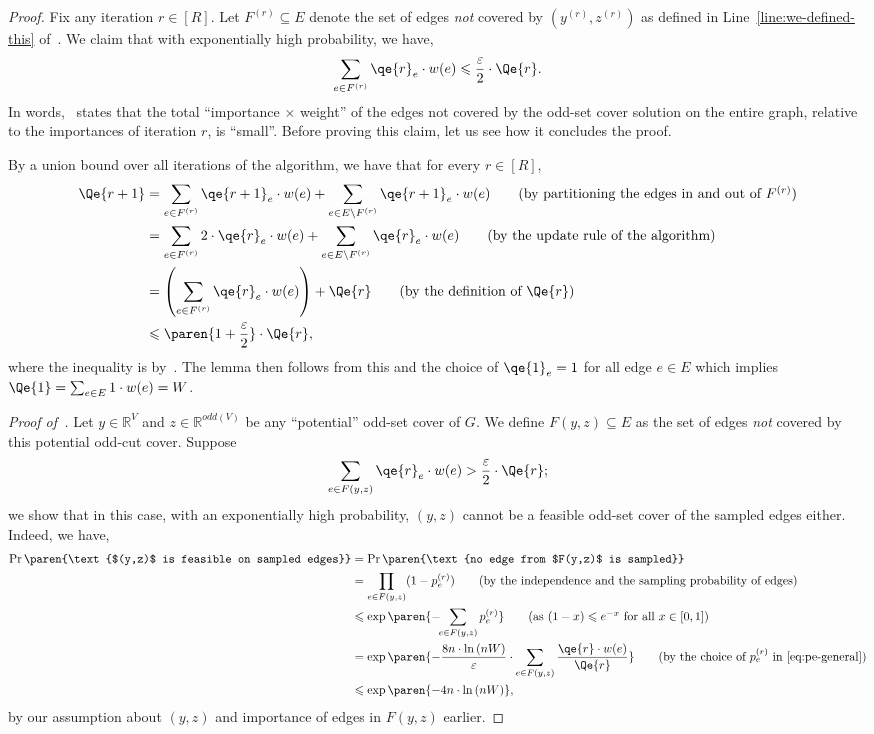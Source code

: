\documentclass{theoretics}
\renewcommand{\leq}{\leqslant}
\DeclarePairedDelimiter{\paren}()
\newcommand{\eps}{\varepsilon}
\newcommand{\IR}{\mathbb{R}}
\begin{document}
\begin{proof}
	Fix any iteration $r \in [R]$. Let $F^{(r)} \subseteq E$ denote the set of edges \emph{not} covered by $(y^{(r)},z^{(r)})$ as defined in Line~\eqref{line:we-defined-this} of~. We claim that with exponentially high probability, we have, 
	\begin{align}
		\sum_{e \in F^{(r)}} \qe{r}_e \cdot w(e) \leq \frac{\eps}{2} \cdot \Qe{r}. \label{eq:clm1-general}
	\end{align}
	In words,~ states that the total ``importance $\times$ weight'' of the edges {not} covered by the odd-set cover solution on the entire graph, relative to the importances of iteration $r$, is ``small''. Before proving this claim, let us see how it concludes the proof. 
	
	By a union bound over all iterations of the algorithm, we have that for every $r \in [R]$, 
	\begin{align*}
		\Qe{r+1} &= \sum_{e \in F^{(r)}} \qe{r+1}_e \cdot w(e) + \sum_{e \in E \setminus F^{(r)}} \qe{r+1}_e \cdot w(e) \tag{by partitioning the edges in and out of $F^{(r)}$} \\
		&= \sum_{e \in F^{(r)}} 2 \cdot \qe{r}_e \cdot w(e) + \sum_{e \in E \setminus F^{(r)}} \qe{r}_e \cdot w(e) \tag{by the update rule of the algorithm} \\
		&= \left({\sum_{e \in F^{(r)}} \qe{r}_e \cdot w(e)}\right) + \Qe{r} \tag{by the definition of $\Qe{r}$} \\
		&\leq \paren{1+\frac{\eps}{2}} \cdot \Qe{r},
	\end{align*}
	where the inequality is by~. The lemma then follows from this and the choice of $\qe{1}_e=1$ for all edge $e \in E$ which implies $\Qe{1} = \sum_{e \in E} 1 \cdot w(e) = W$. 
	
	\noindent
	\emph{Proof of~.} Let $y \in \IR^V$ and $z \in \IR^{odd(V)}$ be any ``potential'' odd-set cover of $G$. 
	We define $F(y,z) \subseteq E$ as the set of edges \emph{not} covered by this potential odd-cut cover. 
	Suppose 
	\[
		\sum_{e \in F(y,z)} \qe{r}_e \cdot w(e) > \frac{\eps}{2} \cdot \Qe{r};
	\]
	we show that in this case, with an exponentially high probability, $(y,z)$ cannot be a feasible odd-set cover  of the sampled edges either. Indeed, we have, 
	\begin{align*}
		\Pr\paren{\text{$(y,z)$ is feasible on sampled edges}} &= \Pr\paren{\text{no edge from $F(y,z)$ is sampled}} \\
		&= \prod_{e \in F(y,z)} (1-p^{(r)}_e) \tag{by the independence and the sampling probability of edges} \\
		&\leq \exp\paren{-\!\!\sum_{e \in F(y,z)} p^{(r)}_e} \tag{as $(1-x) \leq e^{-x}$ for all $x \in [0,1]$} \\
		&= \exp\paren{-\frac{8n \cdot \ln{(nW)}}{\eps} \cdot \sum_{e \in F(y,z)} \frac{\qe{r} \cdot w(e)}{\Qe{r}}} \tag{by the choice of $p^{(r)}_e$ in~\Cref{eq:pe-general}} \\
		&\leq \exp\paren{-4n \cdot \ln{(nW)}},
	\end{align*}
	by our assumption about $(y,z)$ and importance of edges in $F(y,z)$ earlier. 


\end{proof}
\end{document}
